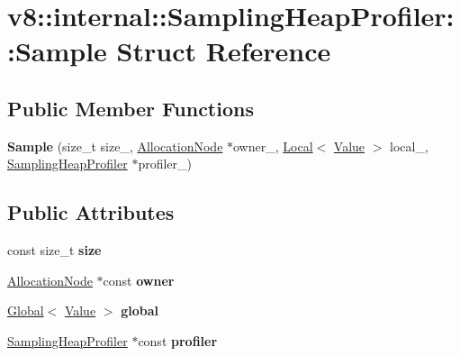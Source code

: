 \hypertarget{structv8_1_1internal_1_1_sampling_heap_profiler_1_1_sample}{}\section{v8\+:\+:internal\+:\+:Sampling\+Heap\+Profiler\+:\+:Sample Struct Reference}
\label{structv8_1_1internal_1_1_sampling_heap_profiler_1_1_sample}
\subsection*{Public Member Functions}
\begin{DoxyCompactItemize}
\item 
{\bfseries Sample} (size\+\_\+t size\+\_\+, \hyperlink{classv8_1_1internal_1_1_sampling_heap_profiler_1_1_allocation_node}{Allocation\+Node} $\ast$owner\+\_\+, \hyperlink{classv8_1_1_local}{Local}$<$ \hyperlink{classv8_1_1_value}{Value} $>$ local\+\_\+, \hyperlink{classv8_1_1internal_1_1_sampling_heap_profiler}{Sampling\+Heap\+Profiler} $\ast$profiler\+\_\+)\hypertarget{structv8_1_1internal_1_1_sampling_heap_profiler_1_1_sample_aac1b858baccc3ac9216b2e16802f76c5}{}\label{structv8_1_1internal_1_1_sampling_heap_profiler_1_1_sample_aac1b858baccc3ac9216b2e16802f76c5}

\end{DoxyCompactItemize}
\subsection*{Public Attributes}
\begin{DoxyCompactItemize}
\item 
const size\+\_\+t {\bfseries size}\hypertarget{structv8_1_1internal_1_1_sampling_heap_profiler_1_1_sample_ac396c0c916339057e38cc3b177a468ee}{}\label{structv8_1_1internal_1_1_sampling_heap_profiler_1_1_sample_ac396c0c916339057e38cc3b177a468ee}

\item 
\hyperlink{classv8_1_1internal_1_1_sampling_heap_profiler_1_1_allocation_node}{Allocation\+Node} $\ast$const {\bfseries owner}\hypertarget{structv8_1_1internal_1_1_sampling_heap_profiler_1_1_sample_af801a2c3ed6c60d5cc883569364463d5}{}\label{structv8_1_1internal_1_1_sampling_heap_profiler_1_1_sample_af801a2c3ed6c60d5cc883569364463d5}

\item 
\hyperlink{classv8_1_1_global}{Global}$<$ \hyperlink{classv8_1_1_value}{Value} $>$ {\bfseries global}\hypertarget{structv8_1_1internal_1_1_sampling_heap_profiler_1_1_sample_a63b3ff855d4ea5536d4c4e9d25343579}{}\label{structv8_1_1internal_1_1_sampling_heap_profiler_1_1_sample_a63b3ff855d4ea5536d4c4e9d25343579}

\item 
\hyperlink{classv8_1_1internal_1_1_sampling_heap_profiler}{Sampling\+Heap\+Profiler} $\ast$const {\bfseries profiler}\hypertarget{structv8_1_1internal_1_1_sampling_heap_profiler_1_1_sample_affe3cb9f7754286cd509828831c7eaeb}{}\label{structv8_1_1internal_1_1_sampling_heap_profiler_1_1_sample_affe3cb9f7754286cd509828831c7eaeb}

\end{DoxyCompactItemize}
